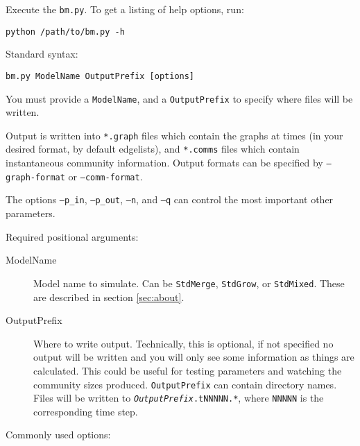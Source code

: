 \documentclass{article}
\def\code#1{\texttt{#1}}
\begin{document}
Execute the \code{bm.py}.  To get a listing of help options, run:

\begin{verbatim}
python /path/to/bm.py -h
\end{verbatim}

Standard syntax:
\begin{verbatim}
bm.py ModelName OutputPrefix [options]
\end{verbatim}
You must provide a \texttt{ModelName}, and a \texttt{OutputPrefix} to
specify where files will be written.

Output is written into \texttt{*.graph} files which contain the graphs
at times (in your desired format, by default edgelists), and
\texttt{*.comms} files which contain instantaneous community
information.  Output formats can be specified by \code{--graph-format}
or \code{--comm-format}.

The options \code{--p\_in}, \code{--p\_out}, \code{--n}, and \code{--q}
can control the most important other parameters.

\vspace{.5cm}

\noindent
Required positional arguments:

\begin{description}
\item[ModelName] Model name to simulate.  Can be \texttt{StdMerge},
  \texttt{StdGrow}, or \texttt{StdMixed}.  These are described
  in section \ref{sec:about}.
\item[OutputPrefix] Where to write output.  Technically, this is
  optional, if not specified no output will be written and you will
  only see some information as things are calculated.  This could be
  useful for testing parameters and watching the community sizes produced.
  \texttt{OutputPrefix} can contain directory names.  Files will be
  written to \texttt{\textsl{OutputPrefix}.tNNNNN.*}, where \texttt{NNNNN} is
  the corresponding time step.
\end{description}


\vspace{.5cm}

\noindent
Commonly used options:
\end{document}
